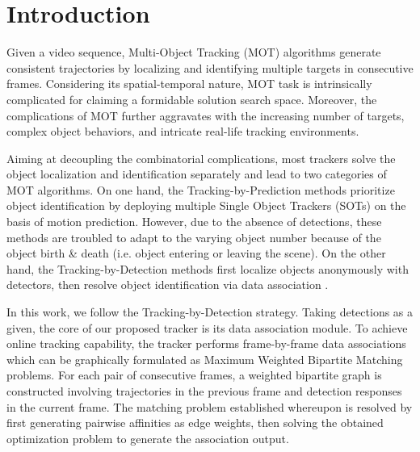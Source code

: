 \documentclass[10pt,twocolumn,letterpaper]{article}
\begin{document}
\section{Introduction}
Given a video sequence, Multi-Object Tracking (MOT) algorithms generate consistent trajectories by localizing and identifying multiple targets in consecutive frames. Considering its spatial-temporal nature, MOT task is intrinsically complicated for claiming a formidable solution search space. Moreover, the complications of MOT further aggravates with the increasing number of targets, complex object behaviors, and intricate real-life tracking environments.

Aiming at decoupling the combinatorial complications, most trackers solve the object localization and identification separately and lead to two categories of MOT algorithms. On one hand, the Tracking-by-Prediction methods \cite{TbyP1, TbyP2, CyberneticsMine} prioritize object identification by deploying multiple Single Object Trackers (SOTs) on the basis of motion prediction. However, due to the absence of detections, these methods are troubled to adapt to the varying object number because of the object birth \& death (i.e. object entering or leaving the scene). On the other hand, the Tracking-by-Detection methods first localize objects anonymously with detectors, then resolve object identification via data association \cite{OnlineMOTCVPR2014, MulticutTang2017, Cvpr18TwoFoldSiamese}.

In this work, we follow the Tracking-by-Detection strategy. Taking detections as a given, the core of our proposed tracker is its data association module. To achieve online tracking capability, the tracker performs frame-by-frame data associations which can be graphically formulated as Maximum Weighted Bipartite Matching problems. For each pair of consecutive frames, a weighted bipartite graph is constructed involving trajectories in the previous frame and detection responses in the current frame. The matching problem established whereupon is resolved by first generating pairwise affinities as edge weights, then solving the obtained optimization problem to generate the association output.
\end{document}
